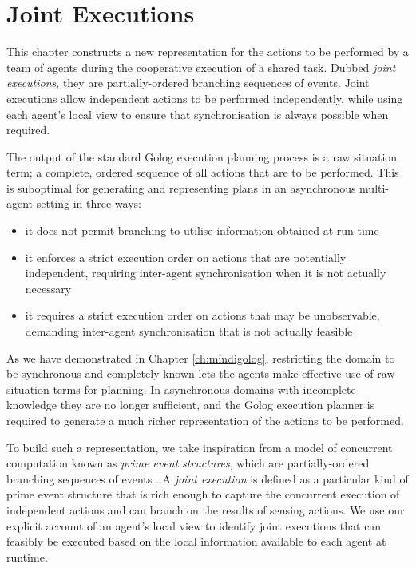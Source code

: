 

\chapter{Joint Executions}

\label{ch:jointexec}

This chapter constructs a new representation for the actions to be
performed by a team of agents during the cooperative execution of
a shared task. Dubbed \emph{joint executions}, they are partially-ordered
branching sequences of events. Joint executions allow independent
actions to be performed independently, while using each agent's local
view to ensure that synchronisation is always possible when required.

The output of the standard Golog execution planning process is a raw
situation term; a complete, ordered sequence of all actions that are
to be performed. This is suboptimal for generating and representing
plans in an asynchronous multi-agent setting in three ways:

\begin{itemize}
\item it does not permit branching to utilise information obtained at run-time 
\item it enforces a strict execution order on actions that are potentially
independent, requiring inter-agent synchronisation when it is not
actually necessary 
\item it requires a strict execution order on actions that may be unobservable,
demanding inter-agent synchronisation that is not actually feasible 
\end{itemize}
As we have demonstrated in Chapter \ref{ch:mindigolog}, restricting
the domain to be synchronous and completely known lets the agents
make effective use of raw situation terms for planning. In asynchronous
domains with incomplete knowledge they are no longer sufficient, and
the Golog execution planner is required to generate a much richer
representation of the actions to be performed.

To build such a representation, we take inspiration from a model of
concurrent computation known as \emph{prime event} \emph{structures},
which are partially-ordered branching sequences of events \citep{npw79event_structures}.
A \emph{joint execution} is defined as a particular kind of prime
event structure that is rich enough to capture the concurrent execution
of independent actions and can branch on the results of sensing actions.
We use our explicit account of an agent's local view to identify joint
executions that can feasibly be executed based on the local information
available to each agent at runtime.

